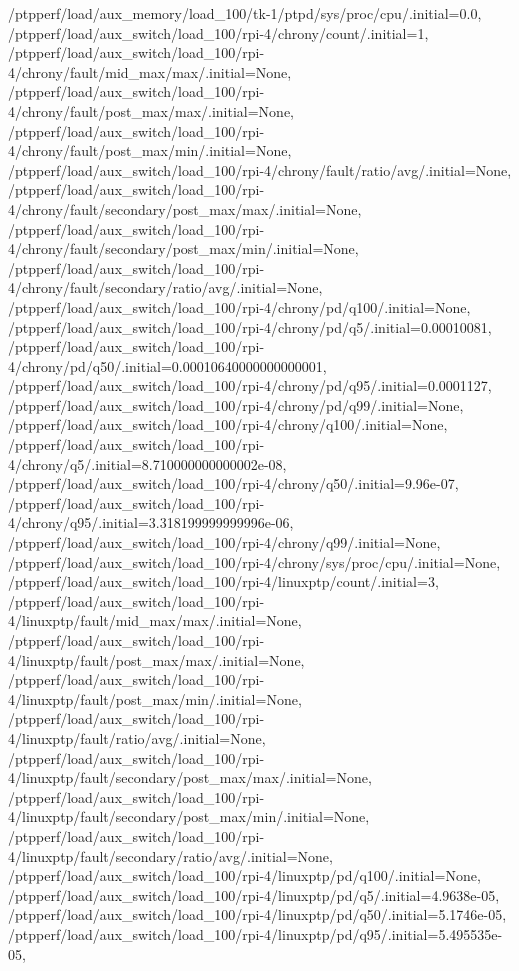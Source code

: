 {    /ptpperf/load/aux_memory/load_100/tk-1/ptpd/sys/proc/cpu/.initial=0.0,
    /ptpperf/load/aux_switch/load_100/rpi-4/chrony/count/.initial=1,
    /ptpperf/load/aux_switch/load_100/rpi-4/chrony/fault/mid_max/max/.initial=None,
    /ptpperf/load/aux_switch/load_100/rpi-4/chrony/fault/post_max/max/.initial=None,
    /ptpperf/load/aux_switch/load_100/rpi-4/chrony/fault/post_max/min/.initial=None,
    /ptpperf/load/aux_switch/load_100/rpi-4/chrony/fault/ratio/avg/.initial=None,
    /ptpperf/load/aux_switch/load_100/rpi-4/chrony/fault/secondary/post_max/max/.initial=None,
    /ptpperf/load/aux_switch/load_100/rpi-4/chrony/fault/secondary/post_max/min/.initial=None,
    /ptpperf/load/aux_switch/load_100/rpi-4/chrony/fault/secondary/ratio/avg/.initial=None,
    /ptpperf/load/aux_switch/load_100/rpi-4/chrony/pd/q100/.initial=None,
    /ptpperf/load/aux_switch/load_100/rpi-4/chrony/pd/q5/.initial=0.00010081,
    /ptpperf/load/aux_switch/load_100/rpi-4/chrony/pd/q50/.initial=0.00010640000000000001,
    /ptpperf/load/aux_switch/load_100/rpi-4/chrony/pd/q95/.initial=0.0001127,
    /ptpperf/load/aux_switch/load_100/rpi-4/chrony/pd/q99/.initial=None,
    /ptpperf/load/aux_switch/load_100/rpi-4/chrony/q100/.initial=None,
    /ptpperf/load/aux_switch/load_100/rpi-4/chrony/q5/.initial=8.710000000000002e-08,
    /ptpperf/load/aux_switch/load_100/rpi-4/chrony/q50/.initial=9.96e-07,
    /ptpperf/load/aux_switch/load_100/rpi-4/chrony/q95/.initial=3.318199999999996e-06,
    /ptpperf/load/aux_switch/load_100/rpi-4/chrony/q99/.initial=None,
    /ptpperf/load/aux_switch/load_100/rpi-4/chrony/sys/proc/cpu/.initial=None,
    /ptpperf/load/aux_switch/load_100/rpi-4/linuxptp/count/.initial=3,
    /ptpperf/load/aux_switch/load_100/rpi-4/linuxptp/fault/mid_max/max/.initial=None,
    /ptpperf/load/aux_switch/load_100/rpi-4/linuxptp/fault/post_max/max/.initial=None,
    /ptpperf/load/aux_switch/load_100/rpi-4/linuxptp/fault/post_max/min/.initial=None,
    /ptpperf/load/aux_switch/load_100/rpi-4/linuxptp/fault/ratio/avg/.initial=None,
    /ptpperf/load/aux_switch/load_100/rpi-4/linuxptp/fault/secondary/post_max/max/.initial=None,
    /ptpperf/load/aux_switch/load_100/rpi-4/linuxptp/fault/secondary/post_max/min/.initial=None,
    /ptpperf/load/aux_switch/load_100/rpi-4/linuxptp/fault/secondary/ratio/avg/.initial=None,
    /ptpperf/load/aux_switch/load_100/rpi-4/linuxptp/pd/q100/.initial=None,
    /ptpperf/load/aux_switch/load_100/rpi-4/linuxptp/pd/q5/.initial=4.9638e-05,
    /ptpperf/load/aux_switch/load_100/rpi-4/linuxptp/pd/q50/.initial=5.1746e-05,
    /ptpperf/load/aux_switch/load_100/rpi-4/linuxptp/pd/q95/.initial=5.495535e-05,
}
